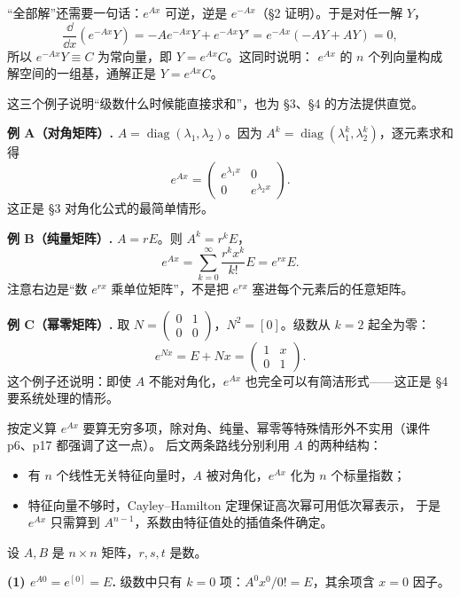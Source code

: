 \documentclass[11pt]{ctexart}
\newcommand{\pmat}[1]{\begin{pmatrix}#1\end{pmatrix}}
\newcommand{\zero}{[0]}
\begin{document}
“全部解”还需要一句话：$e^{Ax}$ 可逆，逆是 $e^{-Ax}$（§2 证明）。于是对任一解 $Y$，
\[
\frac{\dd}{\dd x}\left(e^{-Ax}Y\right)
=-Ae^{-Ax}Y+e^{-Ax}Y'
=e^{-Ax}(-AY+AY)=0,
\]
所以 $e^{-Ax}Y\equiv C$ 为常向量，即 $Y=e^{Ax}C$。这同时说明：
$e^{Ax}$ 的 $n$ 个列向量构成解空间的一组基，通解正是 $Y=e^{Ax}C$。


这三个例子说明“级数什么时候能直接求和”，也为 §3、§4 的方法提供直觉。

\textbf{例 A（对角矩阵）.} $A=\operatorname{diag}(\lambda_1,\lambda_2)$。因为
$A^k=\operatorname{diag}(\lambda_1^k,\lambda_2^k)$，逐元素求和得
\[
e^{Ax}=\pmat{e^{\lambda_1x}&0\\0&e^{\lambda_2x}}.
\]
这正是 §3 对角化公式的最简单情形。

\textbf{例 B（纯量矩阵）.} $A=rE$。则 $A^k=r^kE$，
\[
e^{Ax}=\sum_{k=0}^{\infty}\frac{r^kx^k}{k!}E=e^{rx}E .
\]
注意右边是“数 $e^{rx}$ 乘单位矩阵”，不是把 $e^{rx}$ 塞进每个元素后的任意矩阵。

\textbf{例 C（幂零矩阵）.} 取 $N=\pmat{0&1\\0&0}$，$N^2=\zero$。级数从 $k=2$ 起全为零：
\[
e^{Nx}=E+Nx=\pmat{1&x\\0&1}.
\]
这个例子还说明：即使 $A$ 不能对角化，$e^{Ax}$ 也完全可以有简洁形式——这正是 §4 要系统处理的情形。


按定义算 $e^{Ax}$ 要算无穷多项，除对角、纯量、幂零等特殊情形外不实用（课件 p6、p17 都强调了这一点）。
后文两条路线分别利用 $A$ 的两种结构：
\begin{itemize}
  \item 有 $n$ 个线性无关特征向量时，$A$ 被对角化，$e^{Ax}$ 化为 $n$ 个标量指数；
  \item 特征向量不够时，Cayley--Hamilton 定理保证高次幂可用低次幂表示，
        于是 $e^{Ax}$ 只需算到 $A^{n-1}$，系数由特征值处的插值条件确定。
\end{itemize}



设 $A,B$ 是 $n\times n$ 矩阵，$r,s,t$ 是数。

\textbf{(1) $e^{A0}=e^{\zero}=E$.} 级数中只有 $k=0$ 项：$A^0x^0/0!=E$，其余项含 $x=0$ 因子。
\end{document}
